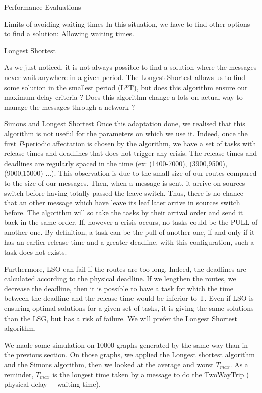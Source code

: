 \documentclass[a4paper,10pt]{report}
\begin{document}
\begin{chapter}{Performance Evaluations}
\begin{section}{Limits of avoiding waiting times}
In this situation, we have to find other options to find a solution: Allowing waiting times.

\end{section}

\begin{section}{Longest Shortest}

As we just noticed, it is not always possible to find a solution where the messages never wait anywhere in a given period.
The Longest Shortest allows us to find some solution in the smallest period (L*T), but does this algorithm ensure our maximum delay criteria ?
Does this algorithm change a lots on actual way to manage the messages through a network ?

\begin{subsection}{Simons and Longest Shortest}
Once this adaptation done, we realised that this algorithm is not useful for the parameters on which we use it. Indeed, once the first $P$-periodic affectation is chosen
by the algorithm, we have a set of tasks with release times and deadlines that does not trigger any crisis.
The release times and deadlines are regularly spaced in the time (ex: (1400-7000), (3900,9500), (9000,15000) ...).
This observation is due to the small size of our routes compared to the size of our messages. Then, when a message is sent, it arrive on sources switch before having totally passed the leave switch. Thus, there is no chance that an other message which have leave its leaf later arrive in sources switch before.
The algorithm will so take the tasks by their arrival order and send it back in the same order. If, however a crisis occurs, no tasks could be the PULL
of another one. By definition, a task can be the pull of another one, if and only if it has an earlier release time and a greater deadline, with this configuration, such a task does not exists.

Furthermore, LSO can fail if the routes are too long. Indeed, the deadlines are calculated according to the physical deadline. If we lengthen the routes, we decrease the deadline, then it is possible to have a task for which the time between the deadline and the release time would be inferior to T.
Even if LSO is ensuring optimal solutions for a given set of tasks, it is giving the same solutions than the LSG, but
has a risk of failure. We will prefer the Longest Shortest algorithm.

We made some simulation on 10000 graphs generated by the same way than in the previous section.
On those graphs, we applied the Longest shortest algorithm and the Simons algorithm, then we looked at the average and worst $T_{max}$.
As a reminder, $T_{max}$ is the longest time taken by a message to do the TwoWayTrip ( physical delay + waiting time).


\end{subsection}
\end{section}
\end{chapter}
\end{document}
